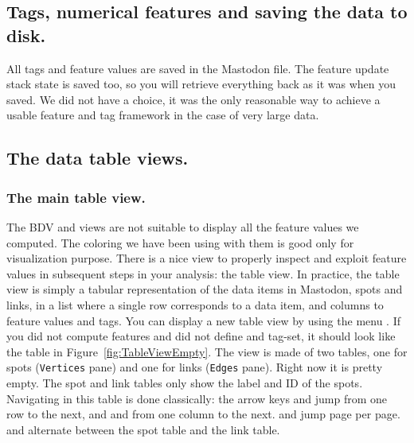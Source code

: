 \subsection{Tags, numerical features and saving the data to disk.}

All tags and feature values are saved in the Mastodon file. 
The feature update stack state is saved too, so you will retrieve everything back as it was when you saved.
We did not have a choice, it was the only reasonable way to achieve a usable feature and tag framework in the case of very large data.


\subsection{The data table views.}
\label{sec:DataTables}

\subsubsection{The main table view.}

The BDV and \TrackScheme views are not suitable to display all the feature values we computed.
The coloring we have been using with them is good only for visualization purpose. 
There is a nice view to properly inspect and exploit feature values in subsequent steps in your analysis: the table view.
In practice, the table view is simply a tabular representation of the data items in Mastodon, spots and links, in a list where a single row corresponds to a data item, and columns to feature values and tags. 
You can display a new table view by using the menu .
If you did not compute features and did not define and tag-set, it should look like the table in Figure~\ref{fig:TableViewEmpty}.
The view is made of two tables, one for spots (\texttt{Vertices} pane) and one for links (\texttt{Edges} pane).
Right now it is pretty empty. 
The spot and link tables only show the label and ID of the spots.
Navigating in this table is done classically: the arrow keys \menu{\arrowkeyup} and \keys{\arrowkeydown} jump from one row to the next, and \keys{\arrowkeyleft} and \keys{\arrowkeyright} from one column to the next.
 and  jump page per page.
 and  alternate between the spot table and the link table.


